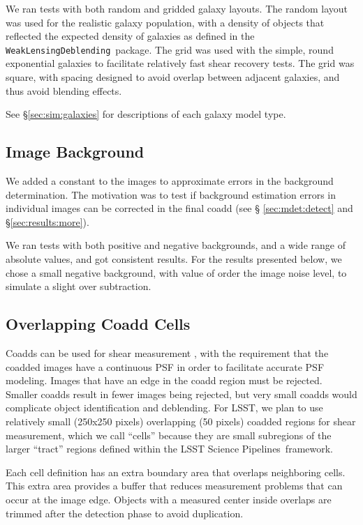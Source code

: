 \documentclass[twocolumn,twocolappendix,astrosym]{openjournal}
\newcommand{\descwl}{\texttt{WeakLensingDeblending}}
\newcommand{\dm}{LSST Science Pipelines}
\begin{document}
We ran tests with both random and gridded galaxy layouts.  The random layout
was used for the realistic galaxy population, with a density of objects that
reflected the expected density of galaxies as defined in the \descwl\ package.
The grid was used with the simple, round exponential galaxies to facilitate
relatively fast shear recovery tests.  The grid was square, with spacing
designed to avoid overlap between adjacent galaxies, and thus avoid blending
effects.

See \S \ref{sec:sim:galaxies} for descriptions of each galaxy model type.

\subsection{Image Background} \label{sec:sim:bgerr}

We added a constant to the images to approximate errors in the background
determination.  The motivation was to test if background estimation errors in
individual images can be corrected in the final coadd (see \S
\ref{sec:mdet:detect} and \S \ref{sec:results:more}).

We ran tests with both positive and negative backgrounds, and a wide range of
absolute values, and got consistent results.  For the results presented below,
we chose a small negative background, with value of order the image noise
level, to simulate a slight over subtraction.

\subsection{Overlapping Coadd Cells} \label{sec:sim:cells}

Coadds can be used for shear measurement \citep{ArmstrongCoadd}, with the
requirement that the coadded images have a continuous PSF in order to
facilitate accurate PSF modeling.  Images that have an edge in the coadd region
must be rejected.  Smaller coadds result in fewer images being rejected, but
very small coadds would complicate object identification and deblending.  For
LSST, we plan to use relatively small (250x250 pixels) overlapping (50 pixels)
coadded regions for shear measurement, which we call ``cells'' because they are
small subregions of the larger ``tract'' regions defined within the \dm\
framework.

Each cell definition has an extra boundary area that overlaps neighboring
cells.  This extra area provides a buffer that reduces measurement problems
that can occur at the image edge.  Objects with a measured center inside
overlaps are trimmed after the detection phase to avoid duplication.
\end{document}
